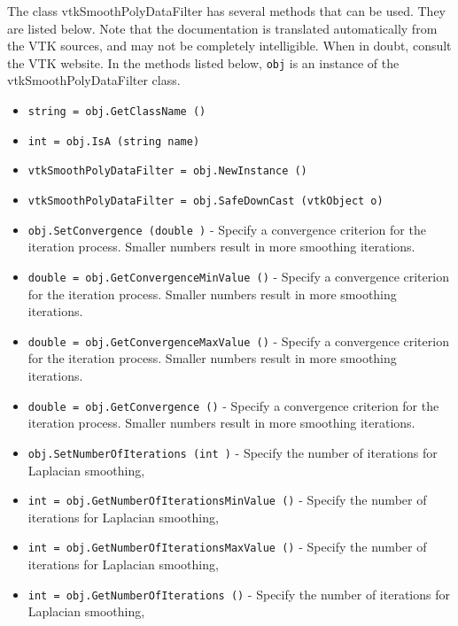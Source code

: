 The class vtkSmoothPolyDataFilter has several methods that can be used.
  They are listed below.
Note that the documentation is translated automatically from the VTK sources,
and may not be completely intelligible.  When in doubt, consult the VTK website.
In the methods listed below, \verb|obj| is an instance of the vtkSmoothPolyDataFilter class.
\begin{itemize}
\item  \verb|string = obj.GetClassName ()|

\item  \verb|int = obj.IsA (string name)|

\item  \verb|vtkSmoothPolyDataFilter = obj.NewInstance ()|

\item  \verb|vtkSmoothPolyDataFilter = obj.SafeDownCast (vtkObject o)|

\item  \verb|obj.SetConvergence (double )| -  Specify a convergence criterion for the iteration
 process. Smaller numbers result in more smoothing iterations.

\item  \verb|double = obj.GetConvergenceMinValue ()| -  Specify a convergence criterion for the iteration
 process. Smaller numbers result in more smoothing iterations.

\item  \verb|double = obj.GetConvergenceMaxValue ()| -  Specify a convergence criterion for the iteration
 process. Smaller numbers result in more smoothing iterations.

\item  \verb|double = obj.GetConvergence ()| -  Specify a convergence criterion for the iteration
 process. Smaller numbers result in more smoothing iterations.

\item  \verb|obj.SetNumberOfIterations (int )| -  Specify the number of iterations for Laplacian smoothing,

\item  \verb|int = obj.GetNumberOfIterationsMinValue ()| -  Specify the number of iterations for Laplacian smoothing,

\item  \verb|int = obj.GetNumberOfIterationsMaxValue ()| -  Specify the number of iterations for Laplacian smoothing,

\item  \verb|int = obj.GetNumberOfIterations ()| -  Specify the number of iterations for Laplacian smoothing,


\end{itemize}
